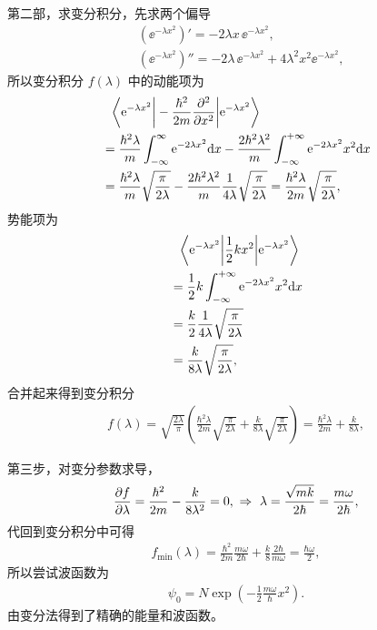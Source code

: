 第二部，求变分积分，先求两个偏导
\begin{align}
    &(\ee^{-\lambda x^2})' = -2\lambda x\,\ee^{-\lambda x^2}, \\
    &(\ee^{-\lambda x^2})'' = -2\lambda \,\ee^{-\lambda x^2} + 4 \lambda^2 x^2 \ee^{-\lambda x^2},
\end{align}
所以变分积分 $f(\lambda)$ 中的动能项为
\begin{align}
    &\phantom{=}{}\bigg\langle \mathrm{e}^{-\lambda x^2} \bigg| -\frac{\hbar^2}{2m} \pdv[2]{x}  \bigg| \mathrm{e}^{-\lambda x^2} \bigg\rangle \\
    &= \frac{\hbar^2\lambda}m \int_{-\infty}^{\infty} \mathrm{e}^{-2\lambda x^2}\mathrm{d} x - \frac{2\hbar^2\lambda^2}m \int_{-\infty}^{+\infty} \mathrm{e}^{-2\lambda x^2} x^2 \mathrm{d} x \\
    &= \frac{\hbar^2\lambda}m \sqrt{\frac{\pi}{2\lambda}} - 
    \frac{2\hbar^2\lambda^2}m \frac1{4\lambda} \sqrt{\frac{\pi}{2\lambda}} = \frac{\hbar^2\lambda}{2m} \sqrt{\frac{\pi}{2\lambda}},
\end{align}
势能项为
\begin{align}
    &\phantom{=}{}\bigg\langle \mathrm{e}^{-\lambda x^2} \bigg|  \frac12 k x^2 \bigg| \mathrm{e}^{-\lambda x^2} \bigg\rangle \\
    &= \frac12 k \int_{- \infty}^{+ \infty} \mathrm{e}^{-2\lambda x^2} x^2 \mathrm{d} x \\
    &= \frac k2 \frac1{4\lambda} \sqrt{\frac{\pi}{2\lambda}} \\
    &= \frac{k}{8\lambda} \sqrt{\frac{\pi}{2\lambda}},
\end{align}
合并起来得到变分积分
\begin{align}
    f(\lambda) = \sqrt{\frac{2\lambda}{\pi}} \left(
        \frac{\hbar^2\lambda}{2m} \sqrt{\frac{\pi}{2\lambda}}
        + \frac{k}{8\lambda} \sqrt{\frac{\pi}{2\lambda}}
    \right) = \frac{\hbar^2\lambda}{2m} + \frac{k}{8\lambda},
\end{align}

第三步，对变分参数求导，
\begin{align}
    \pdv{f}{\lambda} = \frac{\hbar^2}{2m} - \frac{k}{8\lambda^2} = 0, \ \Rightarrow \ \lambda = \frac{\sqrt{mk}}{2\hbar} = \frac{m\omega}{2\hbar}, 
\end{align}
代回到变分积分中可得
\begin{align}
    f_\mathrm{min}(\lambda) = \frac{\hbar^2}{2m} \frac{m\omega}{2\hbar} + \frac k8 \frac{2\hbar}{m\omega} = \frac{\hbar\omega}2,
\end{align}
所以尝试波函数为
\begin{align}
    \psi_0 = N \exp\left(-\frac12 \frac{m\omega}{\hbar}x^2\right). 
\end{align}
由变分法得到了精确的能量和波函数。

